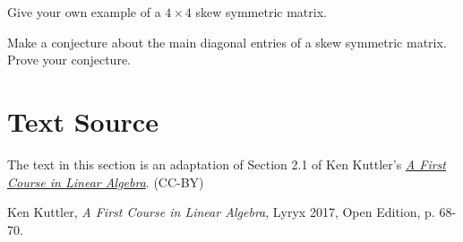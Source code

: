 \documentclass{ximera}
\begin{document}
\begin{problem}\label{prob:4by4symmetricex}
Give your own example of a $4\times 4$ skew symmetric matrix.
\end{problem}

\begin{problem} \label{prob:maindiagskewsymm}
Make a conjecture about the main diagonal entries of a skew symmetric matrix.  Prove your conjecture.
\end{problem}

\section*{Text Source}
The text in this section is an adaptation of Section 2.1 of Ken Kuttler's \href{https://open.umn.edu/opentextbooks/textbooks/a-first-course-in-linear-algebra-2017}{\it A First Course in Linear Algebra}. (CC-BY)

Ken Kuttler, {\it  A First Course in Linear Algebra}, Lyryx 2017, Open Edition, p. 68-70.
\end{document}

